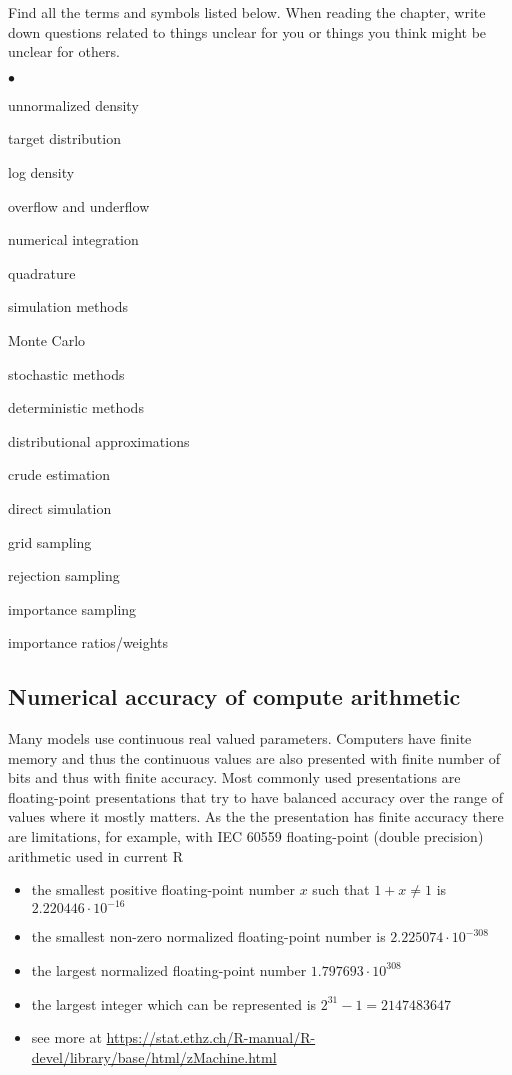 \documentclass[a4paper,11pt,english]{article}
\begin{document}
Find all the terms and symbols listed below. When reading the chapter,
write down questions related to things unclear for you or things you
think might be unclear for others. 
\begin{list}{$\bullet$}{\parsep=0pt\itemsep=2pt}
\item unnormalized density
\item target distribution
\item log density
\item overflow and underflow
\item numerical integration
\item quadrature
\item simulation methods
\item Monte Carlo
\item stochastic methods
\item deterministic methods
\item distributional approximations
\item crude estimation
\item direct simulation
\item grid sampling
\item rejection sampling
\item importance sampling
\item importance ratios/weights
\end{list}

 \subsection*{Numerical accuracy of compute arithmetic}

 Many models use continuous real valued parameters. Computers have finite memory and thus the continuous values are also presented with finite number of bits and thus with finite accuracy. Most commonly used presentations are floating-point presentations that try to have balanced accuracy over the range of values where it mostly matters. As the the presentation has finite accuracy there are limitations, for example, with IEC 60559 floating-point (double precision) arithmetic used in current R
 \begin{itemize}
 \item the smallest positive floating-point number $x$ such that $1 + x \neq 1$ is $2.220446\cdot 10^{-16}$
 \item the smallest non-zero normalized floating-point number is $2.225074\cdot 10^{-308}$
 \item the largest normalized floating-point number $1.797693\cdot 10^{308}$
 \item the largest integer which can be represented is $2^{31} - 1 = 2147483647$
 \item see more at \url{https://stat.ethz.ch/R-manual/R-devel/library/base/html/zMachine.html}
 \end{itemize}
\end{document}
